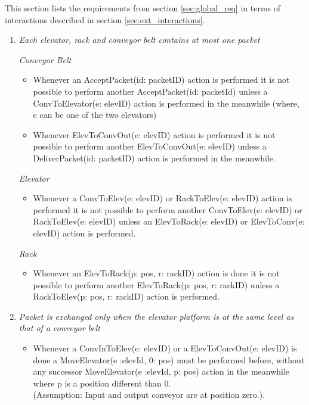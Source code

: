 
This section lists the requirements from section \ref{sec:global_req} in terms of interactions described in section \ref{sec:ext_interactions}.

\begin{enumerate}
\item \textit{Each elevator, rack and conveyor belt contains at most one packet}

	\textit{Conveyor Belt}
	\begin{itemize}
	\item
	Whenever an AcceptPacket(id: packetID) action is performed it
	is not possible to perform another AcceptPacket(id:
	packetId) unless a ConvToElevator(e: elevID) action is
	performed in the meanwhile (where, e can be one of the two elevators)
	\item Whenever ElevToConvOut(e: elevID) action is performed it is
	not possible to perform another ElevToConvOut(e: 
	elevID) unless a DeliverPacket(id: packetID) action is performed in the meanwhile.
	\end{itemize}
	\textit{Elevator}
	\begin{itemize}
	\item Whenever a ConvToElev(e: elevID) or RackToElev(e: elevID) 
	action is performed it is not possible to perform another
	ConvToElev(e: elevID) or RackToElev(e: elevID) unless an 
	ElevToRack(e: elevID) or ElevToConv(e: elevID) action is performed.
	\end{itemize}
	
	\textit{Rack}
	\begin{itemize}
	\item Whenever an ElevToRack(p: pos, r: rackID) action is done it is not
	possible to perform another ElevToRack(p: pos, r: rackID) unless a RackToElev(p: pos, r: rackID) action is performed.%
	\end{itemize}

\item \textit{ Packet is exchanged only when the elevator platform is at
the same level as that of a conveyor belt}
	\begin{itemize}
	\item Whenever a ConvInToElev(e: elevID) or a ElevToConvOut(e: 
	elevID) is done a MoveElevator(e :elevId, 0: pos) must be
	performed before, without any successor MoveElevator(e :elevId, p: pos) action in the meanwhile where p is a position different than 0.\\(Assumption: Input and output conveyor are at
	position zero.).	
	\end{itemize}


\end{enumerate}
